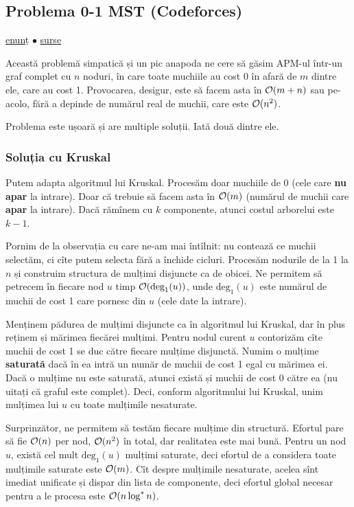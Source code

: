 \documentclass[../main.tex]{subfiles}
\begin{document}
\subsection{Problema 0-1 MST (Codeforces)}
\label{problem:0-1-mst}

\href{https://codeforces.com/contest/1242/problem/B}{enunț}
$\bullet$
\hyperref[code:0-1-mst]{surse}

Această problemă simpatică și un pic anapoda ne cere să găsim APM-ul într-un graf complet cu $n$ noduri, în care toate muchiile au cost 0 în afară de $m$ dintre ele, care au cost 1. Provocarea, desigur, este să facem asta în $\mathcal{O}(m + n)$ sau pe-acolo, fără a depinde de numărul real de muchii, care este $\mathcal{O}(n^2)$.

Problema este ușoară și are multiple soluții. Iată două dintre ele.

\subsubsection*{Soluția cu Kruskal}

Putem adapta algoritmul lui Kruskal. Procesăm doar muchiile de 0 (cele care \textbf{nu apar} la intrare). Doar că trebuie să facem asta în $\mathcal{O}(m)$ (numărul de muchii care \textbf{apar} la intrare). Dacă rămînem cu $k$ componente, atunci costul arborelui este $k-1$.

Pornim de la observația cu care ne-am mai întîlnit: nu contează ce muchii selectăm, ci cîte putem selecta fără a închide cicluri. Procesăm nodurile de la 1 la $n$ și construim structura de mulțimi disjuncte ca de obicei. Ne permitem să petrecem în fiecare nod $u$ timp $\mathcal{O}(\text{deg}_1(u))$, unde $\text{deg}_1(u)$ este numărul de muchii de cost 1 care pornesc din $u$ (cele date la intrare).

Menținem pădurea de mulțimi disjuncte ca în algoritmul lui Kruskal, dar în plus reținem și mărimea fiecărei mulțimi. Pentru nodul curent $u$ contorizăm cîte muchii de cost 1 se duc către fiecare mulțime disjunctă. Numim o mulțime \textbf{saturată} dacă în ea intră un număr de muchii de cost 1 egal cu mărimea ei. Dacă o mulțime nu este saturată, atunci există și muchii de cost 0 către ea (nu uitați că graful este complet). Deci, conform algoritmului lui Kruskal, unim mulțimea lui $u$ cu toate mulțimile nesaturate.

Surprinzător, ne permitem să testăm fiecare mulțime din structură. Efortul pare să fie $\mathcal{O}(n)$ per nod, $\mathcal{O}(n^2)$ în total, dar realitatea este mai bună. Pentru un nod $u$, există cel mult $\text{deg}_1(u)$ mulțimi saturate, deci efortul de a considera toate mulțimile saturate este $\mathcal{O}(m)$. Cît despre mulțimile nesaturate, acelea sînt imediat unificate și dispar din lista de componente, deci efortul global necesar pentru a le procesa este $\mathcal{O}(n \log^{*} n)$.
\end{document}
